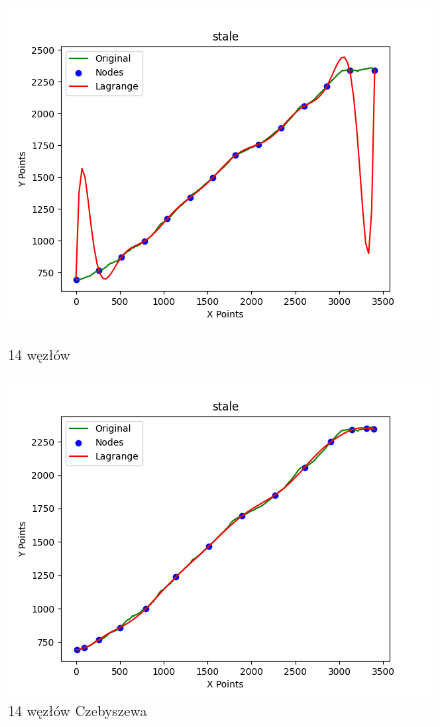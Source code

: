 \documentclass{article}
\begin{document}
\begin{figure}[H]
    \centering
    \begin{minipage}[b]{0.49\textwidth}
        \centering
        \includegraphics[width=\textwidth]{plots/stale_lagrange_14_False.png}
        \caption{14 węzłów}
        \label{fig:7nodes}
    \end{minipage}
    \hfill
    \begin{minipage}[b]{0.49\textwidth}
        \centering
        \includegraphics[width=\textwidth]{plots/stale_lagrange_14_True.png}
        \caption{14 węzłów Czebyszewa}
        \label{fig:7nodes}
    \end{minipage}
\end{figure}
\end{document}
